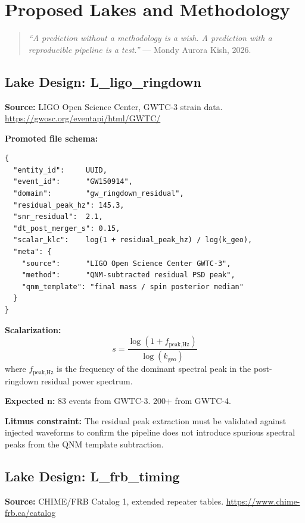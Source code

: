 \documentclass[11pt, letterpaper, openany]{book}
\begin{document}
\clearpage
\chapter{Proposed Lakes and Methodology}

\begin{quote}
\textit{``A prediction without a methodology is a wish.
A prediction with a reproducible pipeline is a test.''} --- Mondy Aurora Kish, 2026.
\end{quote}

\section{Lake Design: L\_ligo\_ringdown}

\textbf{Source:} LIGO Open Science Center, GWTC-3 strain data.
\url{https://gwosc.org/eventapi/html/GWTC/}

\textbf{Promoted file schema:}
\begin{lstlisting}
{
  "entity_id":     UUID,
  "event_id":      "GW150914",
  "domain":        "gw_ringdown_residual",
  "residual_peak_hz": 145.3,
  "snr_residual":  2.1,
  "dt_post_merger_s": 0.15,
  "scalar_klc":    log(1 + residual_peak_hz) / log(k_geo),
  "meta": {
    "source":      "LIGO Open Science Center GWTC-3",
    "method":      "QNM-subtracted residual PSD peak",
    "qnm_template": "final mass / spin posterior median"
  }
}
\end{lstlisting}

\textbf{Scalarization:}
\[
s = \frac{\log(1 + f_\text{peak,Hz})}{\log(k_\text{geo})}
\]
where $f_\text{peak,Hz}$ is the frequency of the dominant spectral peak
in the post-ringdown residual power spectrum.

\textbf{Expected n:} 83 events from GWTC-3. 200+ from GWTC-4.

\textbf{Litmus constraint:} The residual peak extraction must be validated
against injected waveforms to confirm the pipeline does not introduce
spurious spectral peaks from the QNM template subtraction.

\section{Lake Design: L\_frb\_timing}

\textbf{Source:} CHIME/FRB Catalog 1, extended repeater tables.
\url{https://www.chime-frb.ca/catalog}
\end{document}
